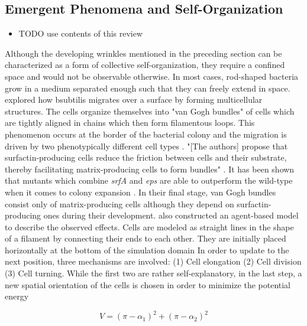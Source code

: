 \documentclass{article}
\begin{document}
\subsection{Emergent Phenomena and Self-Organization}

\begin{itemize}
    \item \cite{Nagarajan2022} TODO use contents of this review
\end{itemize}

Although the developing wrinkles mentioned in the preceding section can be characterized as a form
of collective self-organization, they require a confined space and would not be observable
otherwise.
In most cases, rod-shaped bacteria grow in a medium separated enough such that they can freely
extend in space.
\cite{vanGestel2015} explored how \ac{bsubtilis} migrates over a surface by forming multicellular
structures.
The cells organize themselves into "van Gogh bundles" of cells
which are tightly aligned in chains which then form filamentous loops.
This phenomenon occurs at the border of the bacterial colony and the migration is driven by two
phenotypically different cell types \cite{Lpez2010}.
"[The authors] propose that surfactin-producing cells reduce the friction between cells and their
substrate, thereby facilitating matrix-producing cells to form bundles" \cite{vanGestel2015}.
It has been shown that mutants which combine \textit{srfA} and \textit{eps} are able to outperform
the wild-type when it comes to colony expansion \cite{Velicer2009}.
In their final stage, van Gogh bundles consist only of matrix-producing cells although they depend
on surfactin-producing ones during their development.
\cite{vanGestel2015} also constructed an agent-based model to describe the observed effects.
Cells are modeled as straight lines in the shape of a filament by connecting their ends to each
other.
They are initially placed horizontally at the bottom of the simulation domain
In order to update to the next position, three mechanisms are involved: (1) Cell elongation (2) Cell
division (3) Cell turning.
While the first two are rather self-explanatory, in the last step, a new spatial orientation of the
cells is chosen in order to minimize the potential energy

\begin{equation}
    V = (\pi - \alpha_1)^2 + (\pi - \alpha_2)^2
\end{equation}
\end{document}
